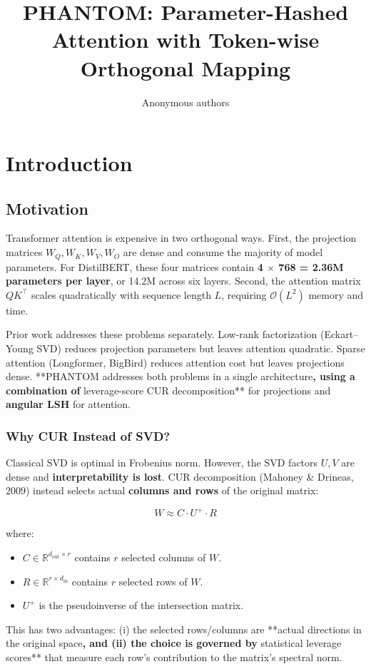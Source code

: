 \title{\textbf{PHANTOM: Parameter-Hashed Attention with Token-wise Orthogonal Mapping}}

\author{Anonymous authors}



\section{Introduction}

\subsection{Motivation}

Transformer attention is expensive in two orthogonal ways. First, the 
projection matrices $W_Q, W_K, W_V, W_O$ are dense and consume the majority 
of model parameters. For DistilBERT, these four matrices contain 
\textbf{4 $\times$ 768  = 2.36M parameters per layer}, or 14.2M across six layers. Second, 
the attention matrix $Q K^\top$ scales quadratically with sequence length 
$L$, requiring $\mathcal{O}(L^2)$ memory and time.

Prior work addresses these problems separately. Low-rank factorization 
(Eckart--Young SVD) reduces projection parameters but leaves attention 
quadratic. Sparse attention (Longformer, BigBird) reduces attention cost but 
leaves projections dense. **PHANTOM addresses both problems in a single 
architecture\textbf{, using a combination of }leverage-score CUR decomposition** 
for projections and \textbf{angular LSH} for attention.

\subsubsection{Why CUR Instead of SVD?}

Classical SVD is optimal in Frobenius norm. However, the SVD factors $U, V$ 
are dense and \textbf{interpretability is lost}. CUR decomposition (Mahoney \& 
Drineas, 2009) instead selects actual \textbf{columns and rows} of the original 
matrix:

\[
W \approx C \cdot U^+ \cdot R
\tag{1.1}
\]

where:
\begin{itemize}
\item $C \in \mathbb{R}^{d_\text{out} \times r}$ contains $r$ selected columns of $W$.
\item $R \in \mathbb{R}^{r \times d_\text{in}}$ contains $r$ selected rows of $W$.
\item $U^+$ is the pseudoinverse of the intersection matrix.

\end{itemize}
This has two advantages: (i) the selected rows/columns are **actual directions 
in the original space\textbf{, and (ii) the choice is governed by }statistical 
leverage scores** that measure each row's contribution to the matrix's 
spectral norm.

